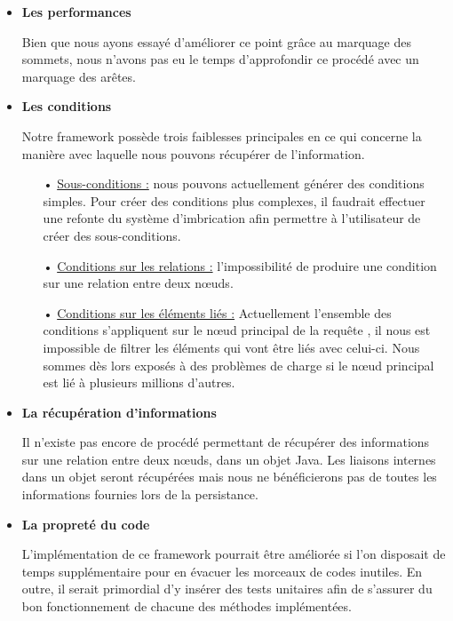 \documentclass[a4paper,fleqn,12pt]{report}
\begin{document}
\begin{itemize}
\item \textbf{Les performances}

\quad Bien que nous ayons essayé d'améliorer ce point grâce au marquage des sommets, nous n'avons pas eu le temps d'approfondir ce procédé avec un marquage des arêtes.

\item \textbf{Les conditions}

\quad Notre framework possède trois faiblesses principales en ce qui concerne la manière avec laquelle nous pouvons récupérer de l'information.
\begin{itemize}
	\item[•] \underline{Sous-conditions :} nous pouvons actuellement générer des conditions simples. Pour créer des conditions plus complexes, il faudrait effectuer une refonte du système d'imbrication afin permettre à l'utilisateur de créer des sous-conditions. 
	\item[•] \underline{Conditions sur les relations :} l'impossibilité de produire une condition sur une relation entre deux nœuds.
	\item[•] \underline{Conditions sur les éléments liés :} Actuellement l'ensemble des conditions s'appliquent sur le nœud principal de la requête , il nous est impossible de filtrer les éléments qui vont être liés avec celui-ci. Nous sommes dès lors exposés à des problèmes de charge si le nœud principal est lié à plusieurs millions d'autres.
\end{itemize}

\item \textbf{La récupération d'informations}

\quad Il n'existe pas encore de procédé permettant de récupérer des informations sur une relation entre deux nœuds, dans un objet Java. Les  liaisons internes dans un objet seront récupérées mais nous ne bénéficierons pas de toutes les informations fournies lors de la persistance.

\item \textbf{La propreté du code}

\quad L'implémentation de ce framework pourrait être améliorée si l'on disposait de temps supplémentaire pour en évacuer les morceaux de codes inutiles. En outre, il serait primordial d'y insérer des tests unitaires afin de s'assurer du bon fonctionnement de chacune des méthodes implémentées.

\end{itemize}  
\end{document}
